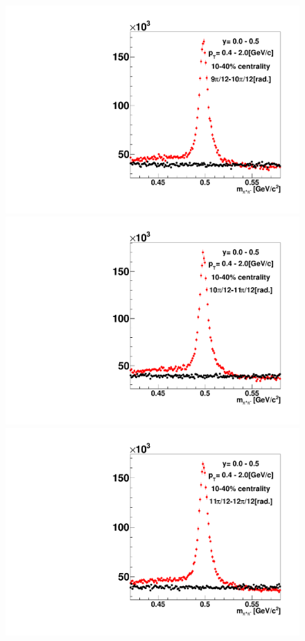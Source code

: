 \begin{figure}[h]
\includegraphics[width=0.14\linewidth]{chapterX/fig/ks_v2_sig/kf_ptslice0_cent1_ks_flow_phi10_rap0_check.pdf}
\includegraphics[width=0.14\linewidth]{chapterX/fig/ks_v2_sig/kf_ptslice0_cent1_ks_flow_phi11_rap0_check.pdf}
\includegraphics[width=0.14\linewidth]{chapterX/fig/ks_v2_sig/kf_ptslice0_cent1_ks_flow_phi12_rap0_check.pdf}


\end{figure}
